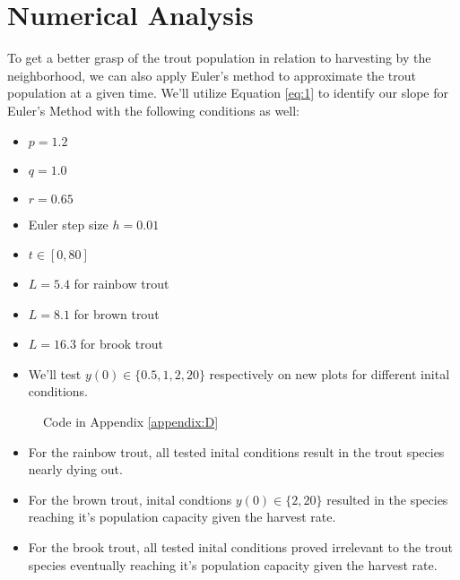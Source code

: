 \documentclass[letterpaper,12pt]{article}
\begin{document}
\section{Numerical Analysis} 
To get a better grasp of the trout population in relation to harvesting by the neighborhood, we can also apply Euler's method to approximate the trout population at a given time. 
We'll utilize Equation \eqref{eq:1} to identify our slope for Euler's Method with the following conditions as well:
\begin{itemize}
    \item \(p = 1.2\)
    \item \(q = 1.0\)
    \item \(r = 0.65\)
    \item Euler step size \(h = 0.01\)
    \item \(t \in [0,80]\)
    \item \(L = 5.4\) for rainbow trout
    \item \(L = 8.1\) for brown trout
    \item \(L = 16.3\) for brook trout
    \item We'll test \(y(0) \in \{0.5,1,2,20\}\) respectively on new plots for different inital conditions.
\end{itemize}
\begin{figure}[H]
    \begin{adjustwidth}{-1in}{-1in}
    \centering
    \begin{subfigure}[b]{0.65\textwidth}
        \centering
        
        \label{fig:5a}
    \end{subfigure}
    \hfill
    \begin{subfigure}[b]{0.65\textwidth}
        \centering
        
        \label{fig:5b}
    \end{subfigure}
    \hfill
    \begin{subfigure}[b]{0.65\textwidth}
        \centering
        
        \label{fig:5c}
    \end{subfigure}
    \hfill
    \begin{subfigure}[b]{0.65\textwidth}
        \centering
        
        \label{fig:5d}
    \end{subfigure}
    \caption{Code in Appendix \ref{appendix:D}}
    \label{fig:5}
    \end{adjustwidth}
\end{figure}
\begin{itemize}
    \item For the rainbow trout, all tested inital conditions result in the trout species nearly dying out.
    \item For the brown trout, inital condtions \(y(0) \in \{2, 20\}\) resulted in the species reaching it's population capacity given the harvest rate.
    \item For the brook trout, all tested inital conditions proved irrelevant to the trout species eventually reaching it's population capacity given the harvest rate.
\end{itemize}
\end{document}
